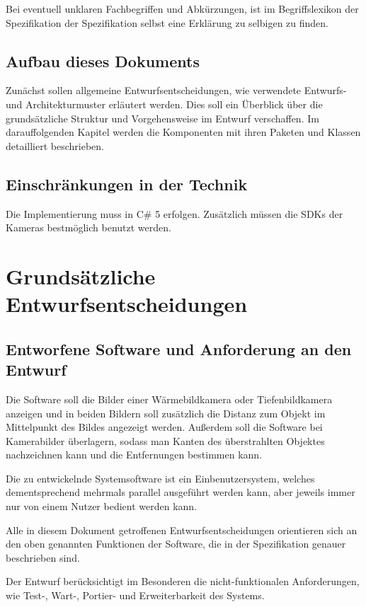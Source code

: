 Bei eventuell unklaren Fachbegriffen und Abkürzungen, ist im Begriffslexikon der Spezifikation \bzw der Spezifikation selbst eine Erklärung zu selbigen zu finden.

\subsection{Aufbau dieses Dokuments}
Zunächst sollen allgemeine Entwurfsentscheidungen, wie verwendete Entwurfs- und Architekturmuster erläutert werden.
Dies soll ein Überblick über die grundsätzliche Struktur und Vorgehensweise im Entwurf verschaffen.
Im darauffolgenden Kapitel werden die Komponenten mit ihren Paketen und Klassen detailliert beschrieben.

\subsection{Einschränkungen in der Technik}
Die Implementierung muss in C\# 5 erfolgen.
Zusätzlich müssen die SDKs der Kameras bestmöglich benutzt werden.

\section{Grundsätzliche Entwurfsentscheidungen}

\subsection{Entworfene Software und Anforderung an den Entwurf}
Die Software soll die Bilder einer Wärmebildkamera oder Tiefenbildkamera anzeigen und in beiden Bildern soll zusätzlich die Distanz zum Objekt im Mittelpunkt des Bildes angezeigt werden.
Außerdem soll die Software bei Kamerabilder überlagern, sodass man Kanten des überstrahlten Objektes nachzeichnen kann und die Entfernungen bestimmen kann.

Die zu entwickelnde Systemsoftware ist ein Einbenutzersystem, welches dementsprechend mehrmals parallel ausgeführt werden kann, aber jeweils immer nur von einem Nutzer bedient werden kann.

Alle in diesem Dokument getroffenen Entwurfsentscheidungen orientieren sich an den oben genannten Funktionen der Software, die in der Spezifikation genauer beschrieben sind.

Der Entwurf berücksichtigt im Besonderen die nicht-funktionalen Anforderungen, wie Test-, Wart-, Portier- und Erweiterbarkeit des Systems.

